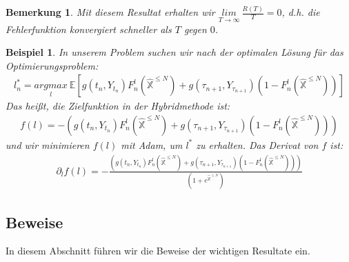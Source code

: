 \documentclass[12pt,titlepage,headsepline]{article}
\newtheorem{beispiel}[definition]{Beispiel}
\newtheorem*{bemerkung*}{Bemerkung}
\begin{document}
      \begin{bemerkung*}
        \textup{
          Mit diesem Resultat erhalten wir $\underset{T \rightarrow \infty}{lim} \ \frac{R(T)}{T} = 0$, d.h. die Fehlerfunktion konvergiert schneller als $T$ gegen $0$.
        }
      \end{bemerkung*}
      \begin{beispiel}
        \textup{
        In unserem Problem suchen wir nach der optimalen Lösung für das Optimierungsproblem:
        \begin{align*}
          l_n^* = \underset{l}{argmax} \ \mathbb{E}[g(t_n, Y_{t_n})F_n^l(\hat{\mathbb{X}}^{\leq N})+g(\tau_{n+1},Y_{\tau_{n+1}})(1-F_n^l(\hat{\mathbb{X}}^{\leq N})) ]
        \end{align*}
        Das heißt, die Zielfunktion in der Hybridmethode ist:
        \begin{align*}
          f(l) = - (g(t_n, Y_{t_n})F_n^{l}(\hat{\mathbb{X}}^{\leq N})+g(\tau_{n+1},Y_{\tau_{n+1}})(1-F_n^{l}(\hat{\mathbb{X}}^{\leq N})))
        \end{align*}
        und wir minimieren $f(l)$ mit Adam, um $l^*$ zu erhalten. Das Derivat von $f$ ist:
        \begin{align*}
          \partial_lf(l) = - \frac{(g(t_n, Y_{t_n})F_n^{l}(\hat{\mathbb{X}}^{\leq N})+g(\tau_{n+1},Y_{\tau_{n+1}})(1-F_n^{l}(\hat{\mathbb{X}}^{\leq N})))}{(1+e^{\hat{\mathbb{X}}^{\leq N}})}
        \end{align*}
        }
      \end{beispiel}
      \newpage

      \subsection{Beweise}\label{appendix:beweise}
      In diesem Abschnitt führen wir die Beweise der wichtigen Resultate ein.
\end{document}
